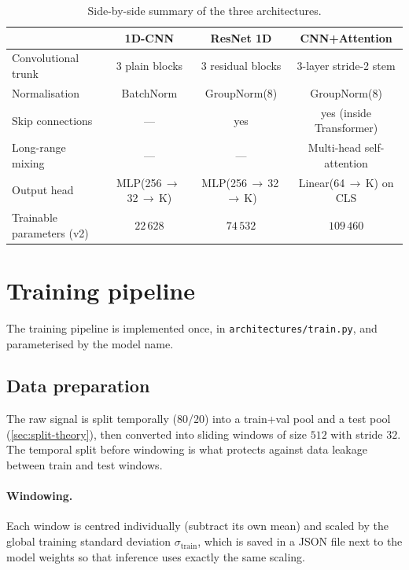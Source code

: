 \begin{table}[H]
    \centering
    \footnotesize
    \begin{tabular}{lccc}
        \toprule
        & \textbf{1D-CNN} & \textbf{ResNet 1D} & \textbf{CNN+Attention} \\
        \midrule
        Convolutional trunk         & 3 plain blocks & 3 residual blocks & 3-layer stride-2 stem \\
        Normalisation               & BatchNorm      & GroupNorm(8)      & GroupNorm(8) \\
        Skip connections            & ---            & yes               & yes (inside Transformer) \\
        Long-range mixing           & ---            & ---               & Multi-head self-attention \\
        Output head                 & MLP(256\,$\to$\,32\,$\to$\,K) & MLP(256\,$\to$\,32\,$\to$\,K) & Linear(64\,$\to$\,K) on CLS \\
        Trainable parameters (v2)   & $22\,628$      & $74\,532$         & $109\,460$ \\
        \bottomrule
    \end{tabular}
    \caption{Side-by-side summary of the three architectures.}
    \label{tab:archi-compare}
\end{table}

\section{Training pipeline}
\label{sec:archi-train}

The training pipeline is implemented once, in
\texttt{architectures/train.py}, and parameterised by the model name.

\subsection{Data preparation}

The raw signal is split temporally (80/20) into a train+val pool and a
test pool (\cref{sec:split-theory}), then converted into sliding
windows of size $512$ with stride $32$. The temporal split before
windowing is what protects against data leakage between train and
test windows.

\paragraph{Windowing.} Each window is centred individually (subtract
its own mean) and scaled by the global training standard deviation
$\sigma_{\text{train}}$, which is saved in a JSON file next to the
model weights so that inference uses exactly the same scaling.

